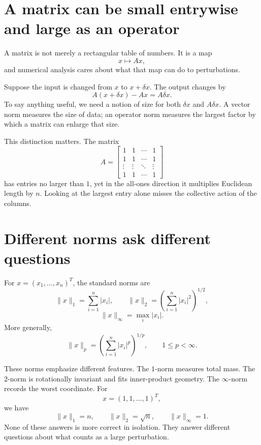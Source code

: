 
\section{A matrix can be small entrywise and large as an operator}

A matrix is not merely a rectangular table of numbers.  It is a map
\[
  x\longmapsto Ax,
\]
and numerical analysis cares about what that map can do to perturbations.

Suppose the input is changed from \(x\) to \(x+\delta x\).  The output changes by
\[
  A(x+\delta x)-Ax=A\delta x.
\]
To say anything useful, we need a notion of size for both \(\delta x\) and \(A\delta x\).  A vector norm measures the size of data; an operator norm measures the largest factor by which a matrix can enlarge that size.

This distinction matters.  The matrix
\[
  A=
  \begin{bmatrix}
    1&1&\cdots&1\\
    1&1&\cdots&1\\
    \vdots&\vdots&\ddots&\vdots\\
    1&1&\cdots&1
  \end{bmatrix}
\]
has entries no larger than \(1\), yet in the all-ones direction it multiplies Euclidean length by \(n\).  Looking at the largest entry alone misses the collective action of the columns.

\section{Different norms ask different questions}

For \(x=(x_1,\ldots,x_n)^T\), the standard norms are
\[
  \|x\|_1=\sum_{i=1}^n|x_i|,
  \qquad
  \|x\|_2=\left(\sum_{i=1}^n|x_i|^2\right)^{1/2},
\]
\[
  \|x\|_\infty=\max_i|x_i|.
\]
More generally,
\[
  \|x\|_p=\left(\sum_{i=1}^n|x_i|^p\right)^{1/p},
  \qquad 1\le p<\infty.
\]

These norms emphasize different features.  The \(1\)-norm measures total mass.  The \(2\)-norm is rotationally invariant and fits inner-product geometry.  The \(\infty\)-norm records the worst coordinate.  For
\[
  x=(1,1,\ldots,1)^T,
\]
we have
\[
  \|x\|_1=n,
  \qquad
  \|x\|_2=\sqrt n,
  \qquad
  \|x\|_\infty=1.
\]
None of these answers is more correct in isolation.  They answer different questions about what counts as a large perturbation.

